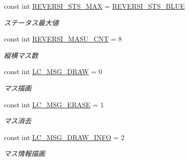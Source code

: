 \begin{DoxyCompactItemize}
const int \hyperlink{class_reversi4color_form_1_1_reversi_const_a63d01450a60c1ba322c9bd3463470751}{R\+E\+V\+E\+R\+S\+I\+\_\+\+S\+T\+S\+\_\+\+M\+AX} = \hyperlink{class_reversi4color_form_1_1_reversi_const_a6a2d24b02a48fef44f3da50413345cc7}{R\+E\+V\+E\+R\+S\+I\+\_\+\+S\+T\+S\+\_\+\+B\+L\+UE}
\begin{DoxyCompactList}\small\item\em ステータス最大値 \end{DoxyCompactList}\item 
\mbox{\label{class_reversi4color_form_1_1_reversi_const_ae1e722b063a26bb016ea889f8fe5b972}} 
const int \hyperlink{class_reversi4color_form_1_1_reversi_const_ae1e722b063a26bb016ea889f8fe5b972}{R\+E\+V\+E\+R\+S\+I\+\_\+\+M\+A\+S\+U\+\_\+\+C\+NT} = 8
\begin{DoxyCompactList}\small\item\em 縦横マス数 \end{DoxyCompactList}\item 
\mbox{\label{class_reversi4color_form_1_1_reversi_const_ab23c144fcb6292e0a660462df5c07214}} 
const int \hyperlink{class_reversi4color_form_1_1_reversi_const_ab23c144fcb6292e0a660462df5c07214}{L\+C\+\_\+\+M\+S\+G\+\_\+\+D\+R\+AW} = 0
\begin{DoxyCompactList}\small\item\em マス描画 \end{DoxyCompactList}\item 
\mbox{\label{class_reversi4color_form_1_1_reversi_const_a459381e82e11aece37dbd6d2969fa0d6}} 
const int \hyperlink{class_reversi4color_form_1_1_reversi_const_a459381e82e11aece37dbd6d2969fa0d6}{L\+C\+\_\+\+M\+S\+G\+\_\+\+E\+R\+A\+SE} = 1
\begin{DoxyCompactList}\small\item\em マス消去 \end{DoxyCompactList}\item 
\mbox{\label{class_reversi4color_form_1_1_reversi_const_ac7e4f55a338434b92592ad5b675010a1}} 
const int \hyperlink{class_reversi4color_form_1_1_reversi_const_ac7e4f55a338434b92592ad5b675010a1}{L\+C\+\_\+\+M\+S\+G\+\_\+\+D\+R\+A\+W\+\_\+\+I\+N\+FO} = 2
\begin{DoxyCompactList}\small\item\em マス情報描画 \end{DoxyCompactList}\item 

\end{DoxyCompactItemize}
